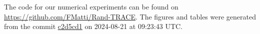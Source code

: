 The code for our numerical experiments can be found on \url{https://github.com/FMatti/Rand-TRACE}. The figures and tables were generated from the commit \href{https://github.com/FMatti/Rand-TRACE/tree/c2d5cd1}{c2d5cd1} on 2024-08-21 at 09:23:43 UTC.
